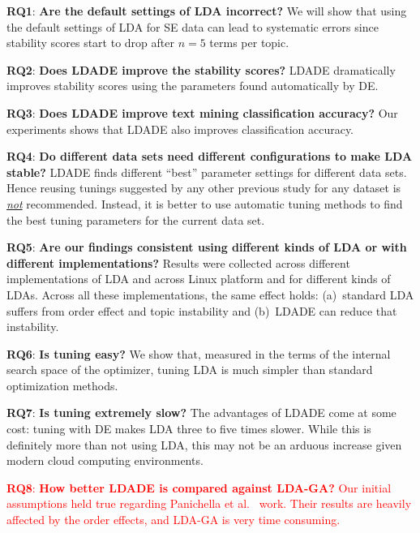 \documentclass[twocolumn,5p,sort&compress]{elsarticle}
\theoremstyle{break}
\begin{document}
\item \textbf{RQ1}: \textbf{Are the default settings of LDA incorrect?} We will show that using the default settings of LDA for SE data can lead to systematic errors since stability scores start to drop after $n=5$ terms per topic.
    \item \textbf{RQ2}: \textbf{Does LDADE improve the stability scores?} LDADE dramatically improves stability scores using
      the parameters found automatically by DE. 
    \item \textbf{RQ3}: \textbf{Does LDADE improve text mining classification accuracy?} 
      Our experiments shows that LDADE  also improves classification accuracy.
    \item \textbf{RQ4}: \textbf{Do different data sets
      need different configurations to make LDA stable?} LDADE finds different ``best'' parameter settings for different data sets. Hence reusing tunings  suggested  by  any other  previous study  for any dataset is \underline{{\em not}} recommended. Instead,  it is better to
      use  automatic  tuning  methods  to find the best tuning parameters for the current data set.
      \item \textbf{RQ5}: \textbf{Are our findings consistent using different kinds of LDA or with different implementations?} Results were collected across different implementations of LDA and across Linux platform and for different kinds of LDAs. Across all these implementations,
        the same effect holds: (a)~standard LDA suffers from order effect and topic instability
        and (b)~LDADE can reduce that instability.
    \item \textbf{RQ6}: \textbf{Is tuning easy?} We show that, measured
      in the terms of the internal search space of the optimizer,
      tuning LDA is much simpler than standard optimization methods.
    \item \textbf{RQ7}: \textbf{Is tuning extremely slow?}
      The advantages of  LDADE come at some cost:
      tuning with DE makes LDA three to five times slower.
      While this is definitely more than not using LDA, this may not be an arduous increase
      given modern cloud computing environments. 
    \item \textcolor{red}{\textbf{RQ8}: \textbf{How better LDADE is compared against LDA-GA?}
    Our initial assumptions held true regarding Panichella et al.~\cite{panichella2013effectively} work. Their results are heavily affected by the order effects, and LDA-GA is very time consuming.
    }
       
\end{document}

